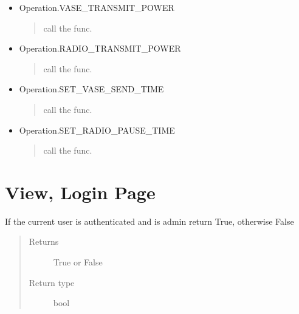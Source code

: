 \documentclass[letterpaper,10pt,english]{sphinxmanual}
\begin{document}
\begin{fulllineitems}
\begin{itemize}
\item {} 
Operation.VASE\_TRANSMIT\_POWER
\begin{quote}

call the func. 
\end{quote}

\item {} 
Operation.RADIO\_TRANSMIT\_POWER
\begin{quote}

call the func. 
\end{quote}

\item {} 
Operation.SET\_VASE\_SEND\_TIME
\begin{quote}

call the func. 
\end{quote}

\item {} 
Operation.SET\_RADIO\_PAUSE\_TIME
\begin{quote}

call the func. 
\end{quote}

\end{itemize}

\end{fulllineitems}



\chapter{View, Login Page}
\label{\detokenize{index:module-view.login}}\label{\detokenize{index:view-login-page}}

\begin{fulllineitems}
\label{\detokenize{index:view.login.is_admin}}
If the current user is authenticated and is admin return True, otherwise False
\begin{quote}\begin{description}
\item[{Returns}] \leavevmode
True or False

\item[{Return type}] \leavevmode
bool

\end{description}\end{quote}

\end{fulllineitems}
\end{document}
